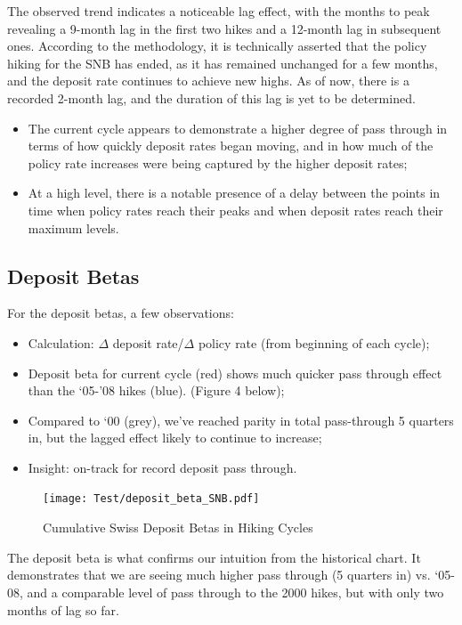 \documentclass{article}
\begin{document}
The observed trend indicates a noticeable lag effect, with the months to peak revealing a 9-month lag in the first two hikes and a 12-month lag in subsequent ones. According to the methodology, it is technically asserted that the policy hiking for the SNB has ended, as it has remained unchanged for a few months, and the deposit rate continues to achieve new highs. As of now, there is a recorded 2-month lag, and the duration of this lag is yet to be determined.
\\

\begin{itemize}
    \item The current cycle appears to demonstrate a higher degree of pass through in
terms of how quickly deposit rates began moving, and in how much of the
policy rate increases were being captured by the higher deposit rates;
    \item At a high level, there is a notable presence of a delay between the points in time when policy rates reach their peaks and when deposit rates reach their maximum levels.
\end{itemize}

\subsection{Deposit Betas}

For the deposit betas, a few observations:

\begin{itemize}
    \item Calculation: $\Delta$ deposit rate/$\Delta$ policy rate  (from beginning of each cycle);
    \item Deposit beta for current cycle (red) shows much quicker pass through effect than the ‘05-’08 hikes (blue). (Figure 4 below);
    \item Compared to ‘00 (grey), we’ve reached parity in total pass-through 5 quarters in, but the lagged effect likely to continue to increase;
    \item Insight: on-track for record deposit pass through. 
\end{itemize}

\begin{figure}[h]
    \centering
    \texttt{[image: Test/deposit\_beta\_SNB.pdf]}
    \caption{Cumulative Swiss Deposit Betas in Hiking Cycles}
    \label{fig:your_pdf}
\end{figure}

The deposit beta is what confirms our intuition from the historical chart. It demonstrates that we are seeing much higher pass through (5 quarters in) vs. ‘05-08, and a comparable level of pass through to the 2000 hikes, but with only two months of lag so far. \\
\end{document}
